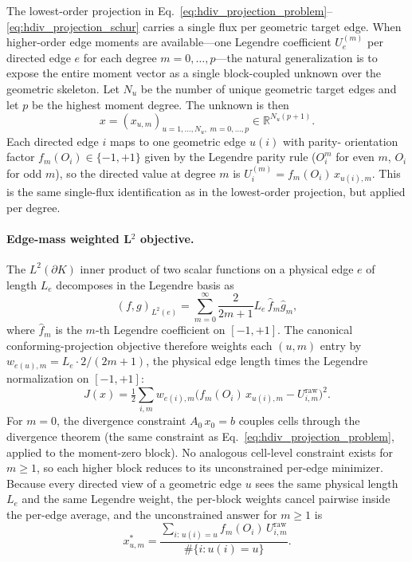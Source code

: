 \documentclass[11pt]{article}
\newcommand{\R}{\mathbb{R}}
\begin{document}
The lowest-order projection in
Eq.~\eqref{eq:hdiv_projection_problem}--\eqref{eq:hdiv_projection_schur} carries a
single flux per geometric target edge.  When higher-order edge moments are
available---one Legendre coefficient \(U^{(m)}_e\) per directed edge \(e\) for
each degree \(m=0,\ldots,p\)---the natural generalization is to expose the
entire moment vector as a single block-coupled unknown over the geometric
skeleton.  Let \(N_u\) be the number of unique geometric target edges and let
\(p\) be the highest moment degree.  The unknown is then
\[
  x = (x_{u,m})_{u=1,\ldots,N_u,\;m=0,\ldots,p} \in \R^{N_u (p+1)}.
\]
Each directed edge \(i\) maps to one geometric edge \(u(i)\) with parity-
orientation factor
\(f_m(O_i)\in\{-1,+1\}\) given by the Legendre parity rule (\(O_i^m\) for
even \(m\), \(O_i\) for odd \(m\)), so the directed value at degree \(m\) is
\(U^{(m)}_i = f_m(O_i)\,x_{u(i),m}\).  This is the same single-flux
identification as in the lowest-order projection, but applied per degree.

\paragraph{Edge-mass weighted L\(^2\) objective.}
The \(L^2(\partial K)\) inner product of two scalar functions on a physical
edge \(e\) of length \(L_e\) decomposes in the Legendre basis as
\[
  (f, g)_{L^2(e)}
  = \sum_{m=0}^{\infty} \frac{2}{2m+1} L_e\,\hat f_m \hat g_m,
\]
where \(\hat f_m\) is the \(m\)-th Legendre coefficient on \([-1,+1]\).  The
canonical conforming-projection objective therefore weights each
\((u,m)\) entry by \(w_{e(u),m} = L_e \cdot 2/(2m+1)\), the physical edge length
times the Legendre normalization on \([-1,+1]\):
\begin{equation}
  J(x)
  = \tfrac{1}{2}\sum_{i,m}
    w_{e(i),m}\bigl(f_m(O_i)\,x_{u(i),m} - U^{\mathrm{raw}}_{i,m}\bigr)^2.
  \label{eq:coupled-conforming-objective}
\end{equation}
For \(m=0\), the divergence constraint \(A_0\,x_0 = b\) couples cells through the
divergence theorem (the same constraint as
Eq.~\eqref{eq:hdiv_projection_problem}, applied to the moment-zero block).  No
analogous cell-level constraint exists for \(m\ge1\), so each higher block
reduces to its unconstrained per-edge minimizer.  Because every directed view
of a geometric edge \(u\) sees the same physical length \(L_e\) and the same
Legendre weight, the per-block weights cancel pairwise inside the per-edge
average, and the unconstrained answer for \(m\ge1\) is
\[
  x^{*}_{u,m}
  = \frac{\sum_{i:\,u(i)=u} f_m(O_i)\,U^{\mathrm{raw}}_{i,m}}{\#\{i:u(i)=u\}}.
\]
\end{document}
